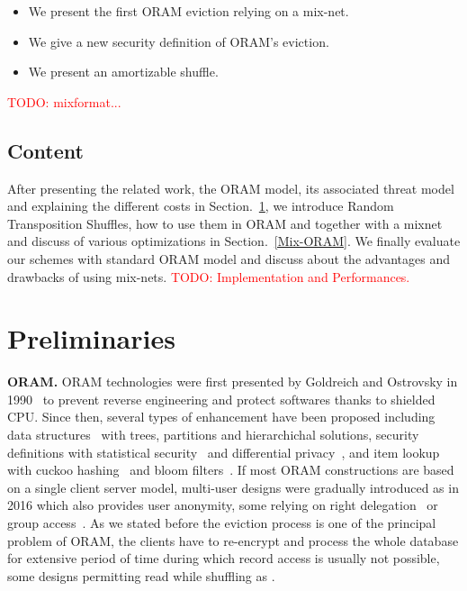 \documentclass{llncs}
\newcommand{\todo}[1]{\textcolor{red}{TODO: #1}}
\begin{document}
\begin{itemize}
 \item We present the first ORAM eviction relying on a mix-net.
 \item We give a new security definition of ORAM's eviction. %
 \item We present an amortizable shuffle.
\end{itemize}
\todo{mixformat...}
%
\subsection{Content}\label{Content}
After presenting the related work, the ORAM model, its associated threat model and explaining the different costs in Section.~\ref{Prelim}, we introduce Random Transposition Shuffles, how to use them in ORAM and together with a mixnet and discuss of various optimizations in Section.~\ref{Mix-ORAM}.
We finally evaluate our schemes with standard ORAM model and discuss about the advantages and drawbacks of using mix-nets.
\todo{Implementation and Performances.}
%
\section{Preliminaries}\label{Prelim}
%
\noindent\textbf{ORAM.}
ORAM technologies were first presented by Goldreich and Ostrovsky in 1990~\cite{ostrovsky1990efficient} to prevent reverse engineering and protect softwares thanks to shielded CPU.
Since then, several types of enhancement have been proposed including data structures~\cite{goldreich1996software,stefanov2011towards,stefanov2013path,ren2014ring} with trees, partitions and hierarchichal solutions,
security definitions with statistical security~\cite{damgaard2011perfectly,ajtai2010oblivious} and differential privacy~\cite{wagh2016root}, and item lookup with cuckoo hashing~\cite{pinkas2010oblivious} and bloom filters~\cite{williams2008building}.
If most ORAM constructions are based on a single client server model, multi-user designs were gradually introduced as \cite{backesanonymous} in 2016 which also provides user anonymity, some relying on right delegation~\cite{franz2011oblivious} or group access~\cite{goodrich2012privacy}.
As we stated before the eviction process is one of the principal problem of ORAM, the clients have to re-encrypt and process the whole database for extensive period of time during which record access is usually not possible, some designs permitting read while shuffling as \cite{boneh2011}.\\
\end{document}
